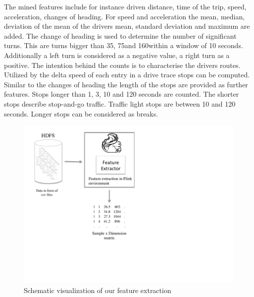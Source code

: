 \documentclass{vldb}
\begin{document}
The mined features include for instance driven distance, time of the trip, speed, acceleration, changes of heading. For speed and acceleration the mean, median, deviation of the mean of the drivers mean, standard deviation and maximum are added. The change of heading is used to determine the number of significant turns. This are turns bigger than 35\degree, 75\degree and 160\degree within a window of 10 seconds. Additionally a left turn is considered as a negative value, a right turn as a positive. The intention behind the counts is to characterise the drivers routes. Utilized by the delta speed of each entry in a drive trace stops can be computed. Similar to the changes of heading the length of the stops are provided as further features. Stops longer than 1, 3, 10 and 120 seconds are counted. The shorter stops describe stop-and-go traffic. Traffic light stops are between 10 and 120 seconds. Longer stops can be considered as breaks.


\begin{figure}
\centering
\includegraphics[trim=1cm 4cm 8cm 0.5cm, clip=true, width=1.2\linewidth]{"pics/approach1"}
\caption{Schematic visualization of our feature extraction}
\label{fig:approach-1}
\end{figure}
\end{document}
